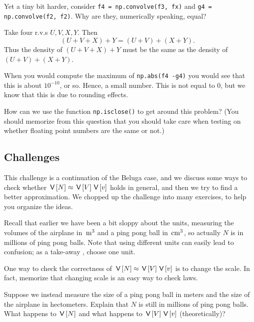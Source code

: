 \documentclass[assignments]{subfiles}
\begin{document}
\begin{exercise}
Yet a tiny bit harder, consider \texttt{f4 = np.convolve(f3, fx)} and \texttt{g4 = np.convolve(f2, f2)}. Why are they, numerically speaking,  equal?
\begin{solution}
Take four r.v.s $U, V, X, Y$. Then
  \begin{equation}
    \label{eq:15}
(U+V+X) + Y = (U+V) + (X+Y).
  \end{equation}
Thus the density of $(U+V+X) + Y$ must be the same as the density of $(U+V) + (X+Y)$.
\end{solution}
\end{exercise}


\begin{exercise}
When you would compute the maximum of \texttt{np.abs(f4 -g4)} you would see that this is about $10^{-10}$, or so.
Hence, a small number.
This is not equal to 0, but we know that this is due to rounding effects.

How can we use the function \texttt{np.isclose()} to get around this problem?
(You should memorize from this question that you should take care when testing on whether floating point numbers are the same or not.)
\end{exercise}



\subsection{Challenges}

This challenge is a continuation of the Beluga case, and we discuss some ways to check whether $\,\mathsf{V}\left[N\right] \approx \,\mathsf{V}\left[V\right] \,\mathsf{V}\left[v\right]$ holds in general, and then we try to find a better approximation. We chopped up the challenge into many exercises, to help you organize the ideas.


Recall that earlier we have been a bit sloppy about the units, measuring the volumes of the airplane in $\,\mathrm{m}^{3}$ and a ping pong ball in $\,\mathrm{cm}^{3}$, so actually $N$ is in millions of ping pong balls.
Note that using different units can easily lead to  confusion; as a take-away , choose one unit.

One way to check the correctness of $\,\mathsf{V}\left[N\right] \approx \,\mathsf{V}\left[V\right] \,\mathsf{V}\left[v\right]$ is to change the scale. In fact, memorize that changing scale is an easy way to check laws.

\begin{exercise}
Suppose we instead measure the size of a ping pong ball in meters and the size of the airplane in hectometers.
Explain that $N$ is still in millions of ping pong balls.
What happens to $\,\mathsf{V}\left[N\right]$ and what happens to $\,\mathsf{V}\left[V\right] \,\mathsf{V}\left[v\right]$ (theoretically)?
\end{exercise}
\end{document}
